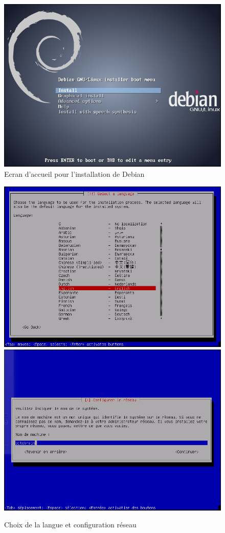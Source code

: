 \begin{figure}[h]
\centering
 \includegraphics[scale=0.5]{img/install/Deb_inst_1.png}
 \caption{Ecran d'accueil pour l'installation de Debian}
\end{figure}
\begin{figure}[h]
 \includegraphics[scale=0.35]{img/install/Deb_inst_2.png}
 \includegraphics[scale=0.35]{img/install/Deb_inst_5.png}
 \caption{Choix de la langue et configuration réseau}
 \end{figure}
